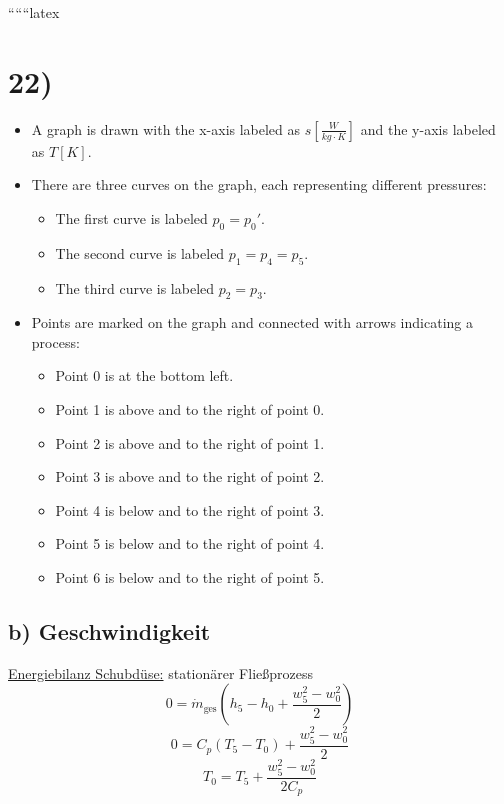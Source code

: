 
``````latex


\section*{22)}

\begin{itemize}
    \item A graph is drawn with the x-axis labeled as $s \left[ \frac{W}{kg \cdot K} \right]$ and the y-axis labeled as $T \left[ K \right]$.
    \item There are three curves on the graph, each representing different pressures:
        \begin{itemize}
            \item The first curve is labeled $p_0 = p_0'$.
            \item The second curve is labeled $p_1 = p_4 = p_5$.
            \item The third curve is labeled $p_2 = p_3$.
        \end{itemize}
    \item Points are marked on the graph and connected with arrows indicating a process:
        \begin{itemize}
            \item Point 0 is at the bottom left.
            \item Point 1 is above and to the right of point 0.
            \item Point 2 is above and to the right of point 1.
            \item Point 3 is above and to the right of point 2.
            \item Point 4 is below and to the right of point 3.
            \item Point 5 is below and to the right of point 4.
            \item Point 6 is below and to the right of point 5.
        \end{itemize}
\end{itemize}

\subsection*{b) Geschwindigkeit}

\underline{Energiebilanz Schubdüse:} stationärer Fließprozess
\[
0 = \dot{m}_{\text{ges}} \left( h_5 - h_0 + \frac{w_5^2 - w_0^2}{2} \right)
\]
\[
0 = C_p \left( T_5 - T_0 \right) + \frac{w_5^2 - w_0^2}{2}
\]
\[
T_0 = T_5 + \frac{w_5^2 - w_0^2}{2 C_p}
\]


